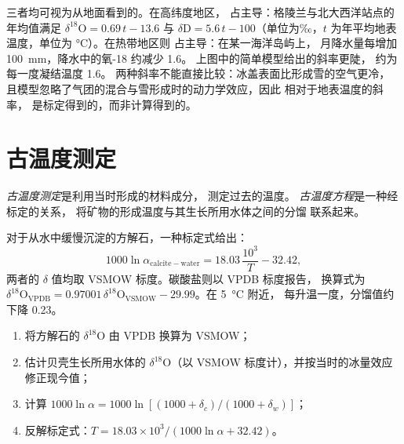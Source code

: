 三者均可视为从地面看到的。在高纬度地区，
占主导：格陵兰与北大西洋站点的年均值满足
$\delta^{18}\mathrm O = 0.69\,t - 13.6$ 与 $\delta\mathrm D =
5.6\,t - 100$（单位为‰，$t$ 为年平均地表温度，单位为 \unit{\celsius}）。在热带地区则
占主导：在某一海洋岛屿上，
月降水量每增加 \qty{100}{mm}，降水中的氧-18 约减少 \qty{1.6}{\permil}。
上图中的简单模型给出的斜率更陡，
约为每一度凝结温度 \qty{1.6}{\permil}。
两种斜率不能直接比较：冰盖表面比形成雪的空气更冷，
且模型忽略了气团的混合与雪形成时的动力学效应，因此
相对于地表温度的斜率，
是标定得到的，而非计算得到的。

\section{古温度测定}\label{sec:b3:stable-isotopes:palaeothermometry}

\begin{definition}
\label{def:b3:stable-isotopes:palaeothermometry}
\emph{古温度测定}是利用当时形成的材料成分，
测定过去的温度。
\emph{古温度方程}是一种经标定的关系，
将矿物的形成温度与其生长所用水体之间的分馏
联系起来。
\end{definition}

对于从水中缓慢沉淀的方解石，一种标定式给出：
\[
1000\ln\alpha_{\mathrm{calcite-water}} = 18.03\,\frac{10^3}{T} - 32.42,
\]
两者的 $\delta$ 值均取 VSMOW 标度。碳酸盐则以 VPDB 标度报告，
换算式为 $\delta^{18}\mathrm O_{\mathrm{VPDB}} =
0.97001\,\delta^{18}\mathrm O_{\mathrm{VSMOW}} - 29.99$。在 \qty{5}{\celsius} 附近，
每升温一度，分馏值约下降 \qty{0.23}{\permil}。

\begin{method}[碳酸盐古温度测定]\label{met:b3:stable-isotopes:palaeotemperature}
\begin{enumerate}
\item 将方解石的 $\delta^{18}\mathrm O$ 由 VPDB 换算为 VSMOW；
\item 估计贝壳生长所用水体的 $\delta^{18}\mathrm O$（以
VSMOW 标度计），并按当时的冰量效应修正现今值；
\item 计算 $1000\ln\alpha = 1000\ln[(1000 + \delta_c)/(1000 + \delta_w)]$；
\item 反解标定式：$T = 18.03\times10^3/(1000\ln\alpha + 32.42)$。
\end{enumerate}
\end{method}

